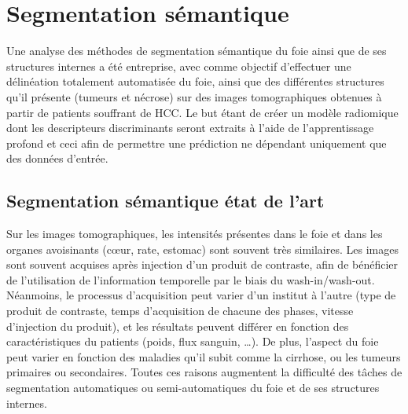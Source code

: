 \documentclass[]{memoir}
\begin{document}
\section{Segmentation sémantique}
Une analyse des méthodes de segmentation sémantique du foie ainsi que de ses structures internes a été entreprise, avec comme objectif d’effectuer une délinéation totalement automatisée du foie, ainsi que des différentes structures qu’il présente (tumeurs et nécrose) sur des images tomographiques obtenues à partir de patients souffrant de HCC. Le but étant de créer un modèle radiomique dont les descripteurs discriminants seront extraits à l’aide de l’apprentissage profond et ceci afin de permettre une prédiction ne dépendant uniquement que des données d’entrée.


\subsection{Segmentation sémantique état de l’art}
Sur les images tomographiques, les intensités présentes dans le foie et dans les organes avoisinants (cœur, rate, estomac) sont souvent très similaires. Les images sont souvent acquises après injection d’un produit de contraste, afin de bénéficier de l’utilisation de l’information temporelle par le biais du wash-in/wash-out.
Néanmoins, le processus d’acquisition peut varier d’un institut à l’autre (type de produit de contraste, temps d’acquisition de chacune des phases, vitesse d’injection du produit), et les résultats peuvent différer en fonction des caractéristiques du patients (poids, flux sanguin, …).
De plus, l’aspect du foie peut varier en fonction des maladies qu’il subit comme la cirrhose, ou les tumeurs primaires ou secondaires. Toutes ces raisons augmentent la difficulté des tâches de segmentation automatiques ou semi-automatiques du foie et de ses structures internes.
\end{document}
